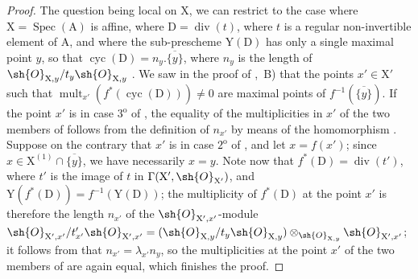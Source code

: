\begin{proof}
The question being local on $\mathrm{X}$, we can restrict to the case where $\mathrm{X}=\operatorname{Spec}(\mathrm{A})$ is affine, where $\mathrm{D}=\operatorname{div}(t)$, where $t$ is a regular non-invertible element of $\mathrm{A}$, and where the sub-prescheme $\mathrm{Y}(\mathrm{D})$  has only a single maximal point $y$, so that $\operatorname{cyc}(\mathrm{D})=n_y.\overline{\{y\}}$, where $n_y$ is the length of $\sh{O}_{\mathrm{X},y}/t_y\sh{O}_{\mathrm{X},y}$ .
We saw in the proof of ,~B) that the points $x'\in\mathrm{X}'$ such that $\operatorname{mult}_{x'}(f^*(\operatorname{cyc}(\mathrm{D})))\neq 0$ are maximal points of $f^{-1}(\overline{\{y\}})$.
If the point $x'$ is in case $3^{\mathrm{o}}$ of , the equality of the multiplicities in $x'$ of the two members of  follows from the definition of $n_{x'}$ by means of the homomorphism .
Suppose on the contrary that $x'$ is in case $2^{\mathrm{o}}$ of , and let $x=f(x')$; since $x\in\mathrm{X}^{(1)}\cap\overline{\{y\}}$, we have necessarily $x=y$.
Note now that $f^*(\mathrm{D})=\operatorname{div}(t')$, where $t'$ is the image of $t$ in $\Gamma(\mathrm{X}',\sh{O}_{\mathrm{X}'})$, and $\mathrm{Y}(f^*(\mathrm{D}))=f^{-1}(\mathrm{Y}(\mathrm{D}))$; the multiplicity of $f^*(\mathrm{D})$ at the point $x'$ is therefore the length $n_{x'}$ of the $\sh{O}_{\mathrm{X}',x'}$-module $\sh{O}_{\mathrm{X}',x'}/t'_{x'}\sh{O}_{\mathrm{X}',x'}=(\sh{O}_{\mathrm{X},y}/t_y\sh{O}_{\mathrm{X},y})\otimes_{\sh{O}_{\mathrm{X},y}}\sh{O}_{\mathrm{X}',x'}$; it follows from  that $n_{x'}=\lambda_{x'}n_y$, so the multiplicities at the point $x'$ of the two members of  are again equal, which finishes the proof.
\end{proof}

